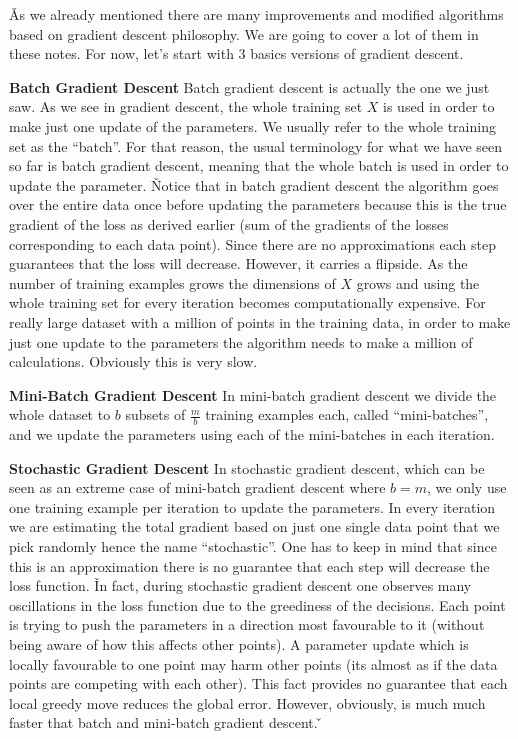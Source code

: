 \v

As we already mentioned there are many improvements and modified algorithms based on gradient descent philosophy. We
are going to cover a lot of them in these notes. For now, let's start with 3 basics versions of gradient descent.
\bit
\item \textbf{Batch Gradient Descent} Batch gradient descent is actually the one we just saw. As we see in gradient
descent, the whole training set $X$ is used in order to make just one update of the parameters. We usually refer to
the whole training set as the ``batch''. For that reason, the usual terminology for what we have seen so far is
batch gradient descent, meaning that the whole batch is used in order to update the parameter. \v

Notice that in batch gradient descent the algorithm goes over the entire data once before updating the parameters
because this is the true gradient of the loss as derived earlier (sum of the gradients of the losses corresponding to
each data point). Since there are no approximations each step guarantees that the loss will decrease. However, it
carries a flipside. As the number of training examples grows the dimensions of $X$ grows and using the whole training
set for every iteration becomes computationally expensive. For really large dataset with a million of points in the
training data, in order to make just one update to the parameters the algorithm needs to make a million of calculations.
Obviously this is very slow.
\item \textbf{Mini-Batch Gradient Descent} In mini-batch gradient descent we divide the whole dataset to $b$ subsets
of $\frac{m}{b}$ training examples each, called ``mini-batches'', and we update the parameters using each of the
mini-batches in each iteration.

\item \textbf{Stochastic Gradient Descent} In stochastic gradient descent, which can be seen as an extreme case of
mini-batch gradient descent where $b=m$, we only use one training example per iteration to update the parameters. In
every iteration we are estimating the total gradient based on just one single data point that we pick randomly hence
the name ``stochastic''. One has to keep in mind that since this is an approximation there is no guarantee that each
step will decrease the loss function. \v

In fact, during stochastic gradient descent one observes many oscillations in the loss function due to the greediness
of the decisions. Each point is trying to push the parameters in a direction most favourable to it (without being
aware of how this affects other points). A parameter update which is locally favourable to one point may harm other
points (its almost as if the data points are competing with each other). This fact provides no guarantee that each
local greedy move reduces the global error. However, obviously, is much much faster that batch and mini-batch
gradient descent. \v

